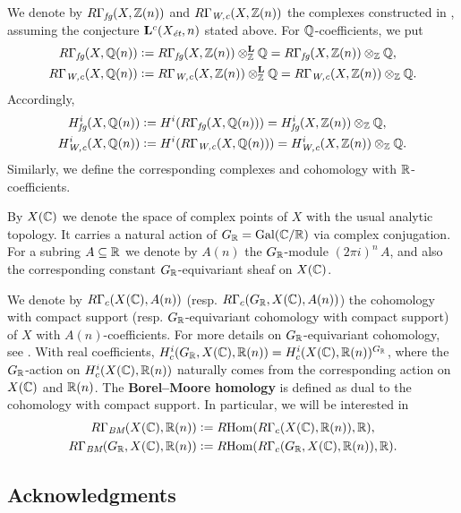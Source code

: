 \documentclass{article}
\numberwithin{equation}{section}
\begin{document}
We denote by $R\Gamma_\fg (X, \ZZ (n))$ and $R\Gamma_\Wc (X, \ZZ (n))$ the
complexes constructed in \cite{Beshenov-Weil-etale-1}, assuming the conjecture
$\mathbf{L}^c (X_\et,n)$ stated above. For $\QQ$-coefficients, we put
\begin{align*}
  R\Gamma_\fg (X, \QQ (n)) & \dfn
  R\Gamma_\fg (X, \ZZ (n)) \otimes_\ZZ^\mathbf{L} \QQ =
  R\Gamma_\fg (X, \ZZ (n)) \otimes_\ZZ \QQ, \\
  R\Gamma_\Wc (X, \QQ (n)) & \dfn
  R\Gamma_\Wc (X, \ZZ (n)) \otimes_\ZZ^\mathbf{L} \QQ =
  R\Gamma_\Wc (X, \ZZ (n)) \otimes_\ZZ \QQ.
\end{align*}
Accordingly,
\begin{align*}
  H^i_\fg (X, \QQ (n)) & \dfn
  H^i (R\Gamma_\fg (X, \QQ (n))) = H^i_\fg (X, \ZZ (n)) \otimes_\ZZ \QQ, \\
  H^i_\Wc (X, \QQ (n)) & \dfn
  H^i (R\Gamma_\Wc (X, \QQ (n))) = H^i_\Wc (X, \ZZ (n)) \otimes_\ZZ \QQ.
\end{align*}
Similarly, we define the corresponding complexes and cohomology with
$\RR$-coefficients.

By $X (\CC)$ we denote the space of complex points of $X$ with the usual
analytic topology. It carries a natural action of $G_\RR = \Gal (\CC/\RR)$ via
complex conjugation. For a subring $A \subseteq \RR$ we denote by $A (n)$ the
$G_\RR$-module $(2\pi i)^n\,A$, and also the corresponding constant
$G_\RR$-equivariant sheaf on $X (\CC)$.

We denote by $R\Gamma_c (X (\CC), A (n))$
(resp. $R\Gamma_c (G_\RR, X (\CC), A (n))$) the cohomology with compact
support (resp. $G_\RR$-equivariant cohomology with compact support) of $X$ with
$A (n)$-coefficients. For more details on $G_\RR$-equivariant cohomology,
see \cite{Beshenov-Weil-etale-1}. With real coefficients,
$H_c^i (G_\RR, X (\CC), \RR (n)) = H^i_c (X (\CC), \RR (n))^{G_\RR}$,
where the $G_\RR$-action on $H^i_c (X (\CC), \RR (n))$ naturally comes from the
corresponding action on $X (\CC)$ and $\RR (n)$.
The \textbf{Borel--Moore homology} is defined as dual to the cohomology with
compact support. In particular, we will be interested in
\begin{align*}
  R\Gamma_\BM (X (\CC), \RR (n)) & \dfn
  \RHom (R\Gamma_c (X (\CC), \RR (n)), \RR), \\
  R\Gamma_\BM (G_\RR, X (\CC), \RR (n)) & \dfn
  \RHom (R\Gamma_c (G_\RR, X (\CC), \RR (n)), \RR).
\end{align*}

\subsection*{Acknowledgments}
\end{document}
